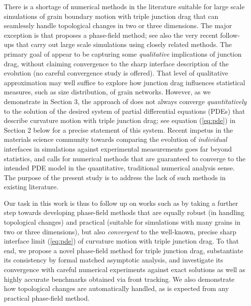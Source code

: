 \documentclass{article}
\theoremstyle{plain}
\theoremstyle{definition}
\theoremstyle{remark}
\begin{document}
There is a shortage of numerical methods in the literature suitable for large scale simulations of grain boundary motion with triple junction drag that can seamlessly handle topological changes in two or three dimensions.
The major exception is \cite{johnsonvoorhees} that proposes a phase-field method; see also the very recent follow-ups \cite{miyoshi2025,miyoshi2026} that carry out large scale simulations using closely related methods.
The primary goal of \cite{johnsonvoorhees,miyoshi2025,miyoshi2026} appear to be capturing some {\em qualitative} implications of junction drag, without claiming convergence to the sharp interface description of the evolution (no careful convergence study is offered).
That level of qualitative approximation may well suffice to explore how junction drag influences statistical measures,  such as size distribution, of grain networks.
However, as we demonstrate in Section 3, the approach of \cite{johnsonvoorhees} does not always converge {\em quantitatively} to the solution of the desired system of partial differential equations (PDEs) that describe curvature motion with triple junction drag; see equation  (\ref{eq:pde}) in Section 2 below for a precise statement of this system.
Recent impetus in the materials science community towards comparing the evolution of {\em individual} interfaces in simulations against experimental measurements goes far beyond statistics, and calls for numerical methods that are guaranteed to converge to the intended PDE model in the quantitative, traditional numerical analysis sense.
The purpose of the present study is to address the lack of such methods in existing literature.


Our task in this work is thus to follow up on works such as \cite{johnsonvoorhees,miyoshi2025} by taking a further step towards developing phase-field methods that are equally robust (in handling topological changes) and practical (suitable for simulations with many grains in two or three dimensions), but also {\em convergent} to the well-known, precise sharp interface limit (\ref{eq:pde}) of curvature motion with triple junction drag.
To that end, we propose a novel phase-field method for triple junction drag, substantiate its consistency by formal matched asymptotic analysis, and investigate its convergence with careful numerical experiments against exact solutions as well as highly accurate benchmarks obtained via front tracking. We also demonstrate how topological changes are automatically handled, as is expected from any practical phase-field method.
\end{document}
